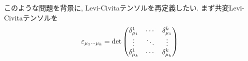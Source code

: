 \documentclass[dvipdfmx]{jsarticle}
\begin{document}
このような問題を背景に, Levi-Civitaテンソルを再定義したい.
まず共変Levi-Civitaテンソルを
\begin{equation*}
    \varepsilon_{\mu_1\cdots\mu_k}
    =
    \det\mqty(
        \delta_{\mu_1}^1 & \cdots & \delta_{\mu_1}^k
        \\
        \vdots & \ddots & \vdots
        \\
        \delta_{\mu_k}^1 & \cdots & \delta_{\mu_k}^k
    )
\end{equation*}
\end{document}
